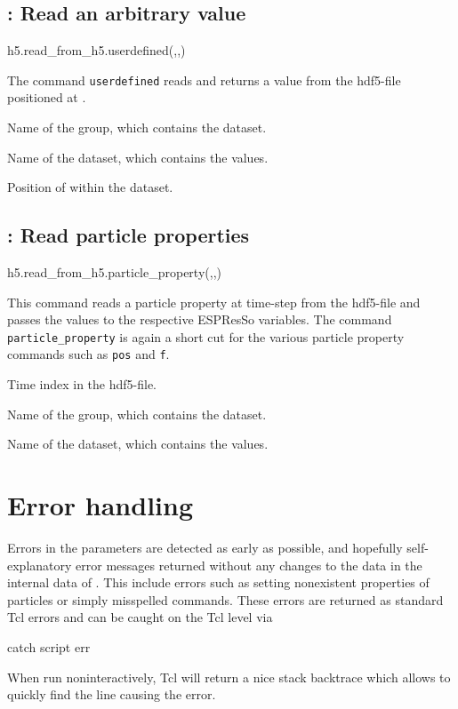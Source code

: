 \subsection{: Read an arbitrary value}
\begin{pyessyntax}
h5.read_from_h5.userdefined(,,)
\end{pyessyntax}
The command \texttt{userdefined} reads and returns a value from the hdf5-file positioned at .
\begin{arguments}
\item[\var{groupname}] Name of the group, which contains the dataset.
\item[\var{datasetname}] Name of the dataset, which contains the values.
\item[\var{datasetindex}] Position of  within the dataset.
\end{arguments}

\subsection{: Read particle properties}
\begin{pyessyntax}
h5.read_from_h5.particle_property(,,)
\end{pyessyntax}
This command reads a particle property at time-step  from the hdf5-file and passes the values to the respective ESPResSo variables. The command \mbox{\texttt{particle_property}} is again a short cut for the various particle property commands such as \texttt{pos} and \texttt{f}.
\begin{arguments}
\item[\var{timestep}] Time index in the hdf5-file. 
\item[\var{groupname}] Name of the group, which contains the dataset.
\item[\var{datasetname}] Name of the dataset, which contains the values.
\end{arguments}



\section{Error handling}
Errors in the parameters are detected as early as possible, and
hopefully self-explanatory error messages returned without any changes
to the data in the internal data of \es. This include errors such as
setting nonexistent properties of particles or simply misspelled
commands. These errors are returned as standard Tcl errors and can be
caught on the Tcl level via
\begin{tclcode}
catch {script} err 
\end{tclcode}
When run noninteractively, Tcl will return a nice stack backtrace
which allows to quickly find the line causing the error.

